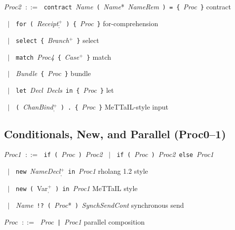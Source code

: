 \documentclass[11pt,a4paper]{article}
\newcommand{\kw}[1]{\texttt{\textcolor{kw}{#1}}}       %
\newcommand{\sym}[1]{\texttt{#1}}                       %
\newcommand{\nt}[1]{\textit{\textcolor{nt}{#1}}}        %
\newcommand{\tok}[1]{\textsf{#1}}                       %
\newcommand{\OR}{\ensuremath{\;\mid\;}}                  %
\newcommand{\bnfdef}{\ensuremath{\;::=\;}}               %
\newenvironment{grammar}{%
  \par\smallskip\begin{list}{}{%
    \setlength{\leftmargin}{1.5em}%
    \setlength{\itemsep}{2pt}%
    \setlength{\parsep}{0pt}}%
}{\end{list}\smallskip}
\begin{document}
\begin{grammar}
\item \nt{Proc2} \bnfdef
    \kw{contract}~\nt{Name}~\sym{(}~\nt{Name}*~\nt{NameRem}~\sym{)}~\sym{=}~\sym{\{}~\nt{Proc}~\sym{\}}
    \hfill\textcolor{cmt}{contract}
\item \phantom{\nt{Proc2}} \OR
    \kw{for}~\sym{(}~\nt{Receipt}$^+_{\texttt{;}}$~\sym{)}~\sym{\{}~\nt{Proc}~\sym{\}}
    \hfill\textcolor{cmt}{for-comprehension}
\item \phantom{\nt{Proc2}} \OR
    \kw{select}~\sym{\{}~\nt{Branch}$^+$~\sym{\}}
    \hfill\textcolor{cmt}{select}
\item \phantom{\nt{Proc2}} \OR
    \kw{match}~\nt{Proc4}~\sym{\{}~\nt{Case}$^+$~\sym{\}}
    \hfill\textcolor{cmt}{match}
\item \phantom{\nt{Proc2}} \OR
    \nt{Bundle}~\sym{\{}~\nt{Proc}~\sym{\}}
    \hfill\textcolor{cmt}{bundle}
\item \phantom{\nt{Proc2}} \OR
    \kw{let}~\nt{Decl}~\nt{Decls}~\kw{in}~\sym{\{}~\nt{Proc}~\sym{\}}
    \hfill\textcolor{cmt}{let}
\item \phantom{\nt{Proc2}} \OR
    \sym{(}~\nt{ChanBind}$^+_{\texttt{,}}$~\sym{)}~\sym{.}~\sym{\{}~\nt{Proc}~\sym{\}}
    \hfill\textcolor{cmt}{MeTTaIL-style input}
\end{grammar}

\subsection{Conditionals, New, and Parallel (Proc0--1)}

\begin{grammar}
\item \nt{Proc1} \bnfdef
    \kw{if}~\sym{(}~\nt{Proc}~\sym{)}~\nt{Proc2}
    \OR
    \kw{if}~\sym{(}~\nt{Proc}~\sym{)}~\nt{Proc2}~\kw{else}~\nt{Proc1}
\item \phantom{\nt{Proc1}} \OR
    \kw{new}~\nt{NameDecl}$^+_{\texttt{,}}$~\kw{in}~\nt{Proc1}
    \hfill\textcolor{cmt}{rholang 1.2 style}
\item \phantom{\nt{Proc1}} \OR
    \kw{new}~\sym{(}~\tok{Var}$^+_{\texttt{,}}$~\sym{)}~\kw{in}~\nt{Proc1}
    \hfill\textcolor{cmt}{MeTTaIL style}
\item \phantom{\nt{Proc1}} \OR
    \nt{Name}~\sym{!?}~\sym{(}~\nt{Proc}*~\sym{)}~\nt{SynchSendCont}
    \hfill\textcolor{cmt}{synchronous send}
\item \nt{Proc} \bnfdef
    \nt{Proc}~\sym{|}~\nt{Proc1}
    \hfill\textcolor{cmt}{parallel composition}
\end{grammar}
\end{document}
